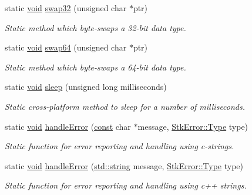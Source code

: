\begin{DoxyCompactItemize}
static \hyperlink{sound_8c_ae35f5844602719cf66324f4de2a658b3}{void} \hyperlink{class_nyq_1_1_stk_a03313811aab6c24b39f1041fe961a54f}{swap32} (unsigned char $\ast$ptr)
\begin{DoxyCompactList}\small\item\em Static method which byte-\/swaps a 32-\/bit data type. \end{DoxyCompactList}\item 
static \hyperlink{sound_8c_ae35f5844602719cf66324f4de2a658b3}{void} \hyperlink{class_nyq_1_1_stk_ab6f7bdf875fe733f732619be3aa89603}{swap64} (unsigned char $\ast$ptr)
\begin{DoxyCompactList}\small\item\em Static method which byte-\/swaps a 64-\/bit data type. \end{DoxyCompactList}\item 
static \hyperlink{sound_8c_ae35f5844602719cf66324f4de2a658b3}{void} \hyperlink{class_nyq_1_1_stk_a6a9d618318d99d01d23bf904e6b03e5b}{sleep} (unsigned long milliseconds)
\begin{DoxyCompactList}\small\item\em Static cross-\/platform method to sleep for a number of milliseconds. \end{DoxyCompactList}\item 
static \hyperlink{sound_8c_ae35f5844602719cf66324f4de2a658b3}{void} \hyperlink{class_nyq_1_1_stk_a03c8329487e627f54df7aa2ce8ef44e0}{handle\+Error} (\hyperlink{getopt1_8c_a2c212835823e3c54a8ab6d95c652660e}{const} char $\ast$message, \hyperlink{class_nyq_1_1_stk_error_a5fde28aabab32abdb02b1078542bd3e8}{Stk\+Error\+::\+Type} type)
\begin{DoxyCompactList}\small\item\em Static function for error reporting and handling using c-\/strings. \end{DoxyCompactList}\item 
static \hyperlink{sound_8c_ae35f5844602719cf66324f4de2a658b3}{void} \hyperlink{class_nyq_1_1_stk_a2f5c48d8e177d91b44ec4d3f882cb3f8}{handle\+Error} (\hyperlink{test__lib_f_l_a_c_2format_8c_ab02026ad0de9fb6c1b4233deb0a00c75}{std\+::string} message, \hyperlink{class_nyq_1_1_stk_error_a5fde28aabab32abdb02b1078542bd3e8}{Stk\+Error\+::\+Type} type)
\begin{DoxyCompactList}\small\item\em Static function for error reporting and handling using c++ strings. \end{DoxyCompactList}\item 

\end{DoxyCompactItemize}
